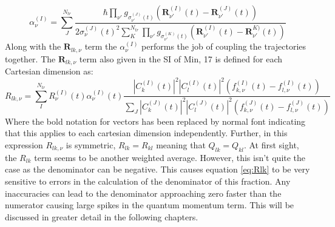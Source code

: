 \begin{equation}
  \alpha_{\nu}^{(I)} = \sum_{J}^{N_{tr}} \frac{\hbar \prod_{\nu'} g_{\sigma_{\nu'}^{(J)}(t)}\left(\mathbf{R}_{\nu'}^{(I)}(t) -         \mathbf{R}_{\nu'}^{(J)}(t)\right)}   {2 \sigma_{\nu}^{(J)}(t)^2\sum_{K}^{N_{tr}}\prod_{\nu'}                                           g_{\sigma_{\nu'}^{(K)}(t)}\left(\mathbf{R}_{\nu'}^{(I)}(t) - \mathbf{R}_{\nu'}^{K)}(t)\right)}
  \label{eq:alpha}
\end{equation}
Along with the $\mathbf{R}_{lk, \nu}$ term the $\alpha_{\nu}^{(I)}$ performs the job of coupling the trajectories together. The $\mathbf{R}_{lk, \nu}$ term also given in the SI of Min, 17\cite{min_ab_2017} is defined for each Cartesian dimension as:
\begin{equation}
  R_{lk, \nu} = \sum_{I}^{N_{tr}} R_{\nu}^{(I)}(t) \alpha_{\nu}^{(I)}(t) \frac{|C_{k}^{(I)}(t)|^2 |C_{l}^{(I)}(t)|^2 \left( f_{k,      \nu}^{(I)}(t) - f_{l, \nu}^{(I)}(t) \right)}{\sum_{J} |C_{k}^{(J)}(t)|^2 |C_{l}^{(J)}(t)|^2 \left( f_{k, \nu}^{(J)}(t) - f_{l,         \nu}^{(J)}(t) \right)}
  \label{eq:Rlk}
\end{equation}
Where the bold notation for vectors has been replaced by normal font indicating that this applies to each cartesian dimension          independently. Further, in this expression $R_{lk, \nu}$ is symmetric, $R_{lk} = R_{kl}$ meaning that $Q_{lk} = Q_{kl}$. At first sight, the $R_{lk}$ term seems to be another weighted average. However, this isn't quite the case as the denominator can be negative. This causes equation \eqref{eq:Rlk} to be very sensitive to errors in the calculation of the denominator of this fraction. Any inaccuracies can lead to the denominator approaching zero faster than the numerator causing large spikes in the quantum momentum term. This will be discussed in greater detail in the following chapters.


